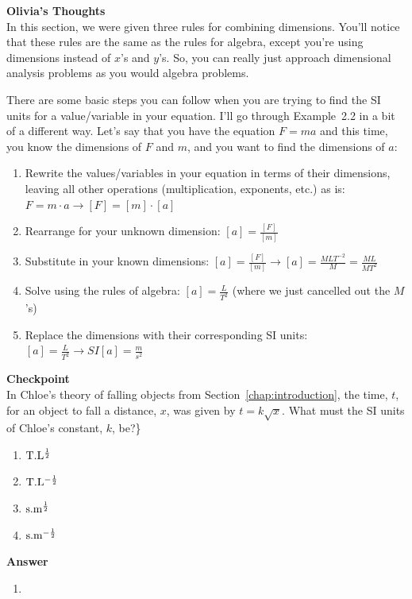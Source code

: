 \begin{framed}
\textbf{Olivia's Thoughts}\\
In this section, we were given three rules for combining dimensions. You'll notice that these rules are the same as the rules for algebra, except you're using dimensions instead of $x$'s and $y$'s. So, you can really just approach dimensional analysis problems as you would algebra problems.

There are some basic steps you can follow when you are trying to find the SI units for a value/variable in your equation. I'll go through Example~2.2 in a bit of a different way. Let's say that you have the equation $F=ma$ and this time, you know the dimensions of $F$ and $m$, and you want to find the dimensions of $a$:

\begin{enumerate}
\item Rewrite the values/variables in your equation in terms of their dimensions, leaving all other operations (multiplication, exponents, etc.) as is: $F=m\cdot a\rightarrow [F]=[m]\cdot[a]$
\item Rearrange for your unknown dimension: $[a]=\frac{[F]}{[m]}$
\item Substitute in your known dimensions: $[a]=\frac{[F]}{[m]} \rightarrow [a]=\frac{MLT^{ -2}}{M}=\frac{ML}{MT^2}$
\item Solve using the rules of algebra: $[a]=\frac{L}{T^2}$ (where we just cancelled out the $M$'s)
\item Replace the dimensions with their corresponding SI units: $[a]=\frac{L}{T^2}\rightarrow SI[a]=\frac{m}{s^2}$
\end{enumerate}
\end{framed}

\begin{framed}
\textbf{Checkpoint}\\
In Chloe's theory of falling objects from Section~\ref{chap:introduction}, the time, $t$, for an object to fall a distance, $x$, was given by $t=k\sqrt{x}$. What must the SI units of Chloe's constant, $k$, be?\}

\begin{enumerate}
\item ${\rm T.L^{\frac{1}{2}}}$
\item ${\rm T.L^{ -\frac{1}{2}}}$
\item ${\rm s.m^{\frac{1}{2}}}$
\item ${\rm s.m^{ -\frac{1}{2}}}$
\end{enumerate}

\begin{framed}
\textbf{Answer}\\
\begin{enumerate}[resume]
\item
\end{enumerate}
\end{framed}
\end{framed}

